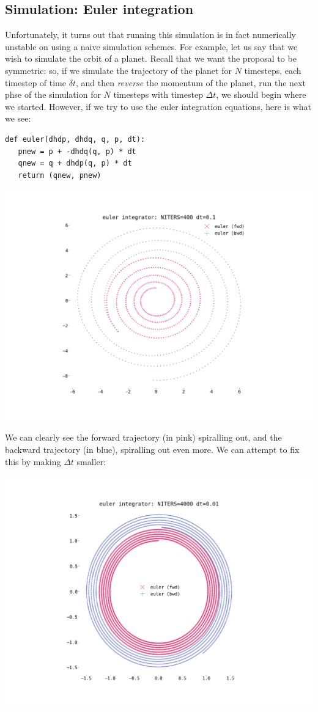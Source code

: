 \documentclass[titlepage]{article}
\begin{document}
\subsection{Simulation: Euler integration}
Unfortunately, it turns out that running this simulation is in fact numerically
unstable on using a naive simulation schemes. For example, let us say
that we wish to simulate the orbit of a planet. Recall that we want
the proposal to be symmetric: so, if we simulate the trajectory of the planet
for $N$ timesteps, each timestep of time $\delta t$, and then \emph{reverse}
the momentum of the planet, run the next phse of the simulation for $N$ timesteps
with timestep $\Delta t$, we should begin where we started. However,
if we try to use the euler integration equations, here is what we see:

\begin{verbatim}
def euler(dhdp, dhdq, q, p, dt):
   pnew = p + -dhdq(q, p) * dt
   qnew = q + dhdp(q, p) * dt
   return (qnew, pnew)
\end{verbatim}

\includegraphics[width=\textwidth]{./euler-dt-0-1.png}

We can clearly see the forward trajectory (in pink) spiralling out, and
the backward trajectory (in blue), spiralling out even more. We can attempt
to fix this by making $\Delta t$ smaller:

\includegraphics[width=\textwidth]{./euler-dt-0-01.png}
\end{document}

